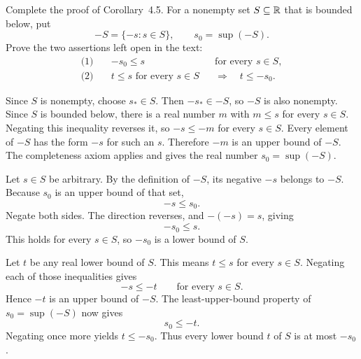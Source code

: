

\goal Complete the proof of Corollary~4.5. For a nonempty set
$S\subseteq\mathbb{R}$ that is bounded below, put
\[
 -S=\{-s:s\in S\},\qquad s_0=\sup(-S).
\]
Prove the two assertions left open in the text:
\begin{align*}
 \text{(1)}\quad&-s_0\le s &&\text{for every }s\in S,\\
 \text{(2)}\quad&t\le s\text{ for every }s\in S
       &&\Longrightarrow\quad t\le-s_0.
\end{align*}

Since $S$ is nonempty, choose $s_*\in S$. Then $-s_*\in-S$, so
$-S$ is also nonempty. Since $S$ is bounded below, there is a real
number $m$ with $m\le s$ for every $s\in S$.
Negating this inequality reverses it, so $-s\le-m$ for every $s\in S$.
Every element of $-S$ has the form $-s$ for such an $s$. Therefore
$-m$ is an upper bound of $-S$. The completeness axiom applies and
gives the real number $s_0=\sup(-S)$.

Let $s\in S$ be arbitrary. By the definition of $-S$, its negative
$-s$ belongs to $-S$. Because $s_0$ is an upper bound of that set,
\[
 -s\le s_0.
\]
Negate both sides. The direction reverses, and $-(-s)=s$, giving
\[
 -s_0\le s.
\]
This holds for every $s\in S$, so $-s_0$ is a lower bound of $S$.

Let $t$ be any real lower bound of $S$. This means
$t\le s$ for every $s\in S$. Negating each of those inequalities gives
\[
 -s\le-t\qquad\text{for every }s\in S.
\]
Hence $-t$ is an upper bound of $-S$. The least-upper-bound property
of $s_0=\sup(-S)$ now gives
\[
 s_0\le-t.
\]
Negating once more yields $t\le-s_0$. Thus every lower bound $t$ of
$S$ is at most $-s_0$.



